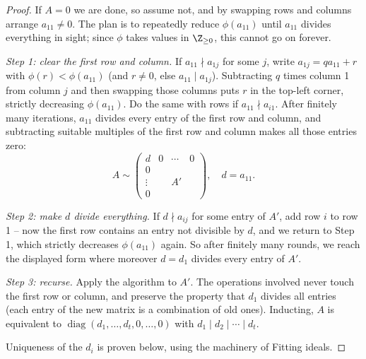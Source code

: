 \begin{proof}
	If $A = 0$ we are done, so assume not, and by swapping rows and columns arrange $a_{11} \neq 0$. The plan is to repeatedly reduce $\phi(a_{11})$ until $a_{11}$ divides everything in sight; since $\phi$ takes values in $\Z_{\geq 0}$, this cannot go on forever.

	\emph{Step 1: clear the first row and column.} If $a_{11} \nmid a_{1j}$ for some $j$, write $a_{1j} = q a_{11} + r$ with $\phi(r) < \phi(a_{11})$ (and $r \neq 0$, else $a_{11} \mid a_{1j}$). Subtracting $q$ times column 1 from column $j$ and then swapping those columns puts $r$ in the top-left corner, strictly decreasing $\phi(a_{11})$. Do the same with rows if $a_{11} \nmid a_{i1}$. After finitely many iterations, $a_{11}$ divides every entry of the first row and column, and subtracting suitable multiples of the first row and column makes all those entries zero:
	$$
	A \sim \begin{pmatrix}
		d & 0 & \cdots & 0 \\
		0 & & & \\
		\vdots & & A' & \\
		0 & & &
	\end{pmatrix}, \quad d = a_{11}.
	$$

	\emph{Step 2: make $d$ divide everything.} If $d \nmid a_{ij}$ for some entry of $A'$, add row $i$ to row 1 -- now the first row contains an entry not divisible by $d$, and we return to Step 1, which strictly decreases $\phi(a_{11})$ again. So after finitely many rounds, we reach the displayed form where moreover $d = d_1$ divides every entry of $A'$.

	\emph{Step 3: recurse.} Apply the algorithm to $A'$. The operations involved never touch the first row or column, and preserve the property that $d_1$ divides all entries (each entry of the new matrix is a combination of old ones). Inducting, $A$ is equivalent to $\operatorname{diag}(d_1, \dots, d_t, 0, \dots, 0)$ with $d_1 \mid d_2 \mid \cdots \mid d_t$.

	Uniqueness of the $d_i$ is proven below, using the machinery of Fitting ideals.
\end{proof}

